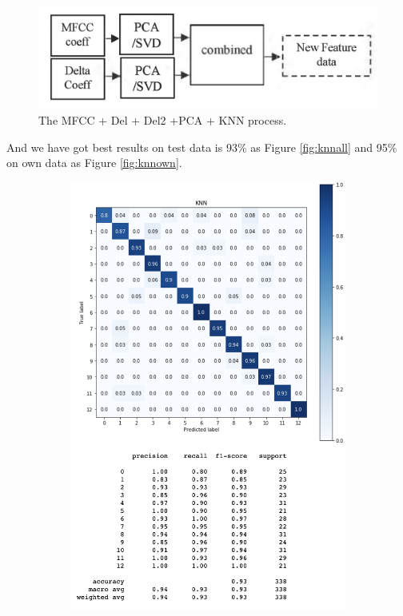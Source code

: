\documentclass[%
  article,%
  10pt,%
  a4paper,%
  fleqn,%
  oneside,%
  sumario = tradicional,%
  chapter = TITLE,%
  section = TITLE,%
]{abntex2}
\begin{document}
\begin{figure}[H]
  \centering
  \includegraphics[width = 0.7\columnwidth]{./Figuras/pcs}
  \caption{The MFCC + Del + Del2 +PCA + KNN process.}
  \label{fig:pcs}
\end{figure}
And we have got best results on test data is 93\% as Figure \ref{fig:knnall} and 95\% on own data as Figure \ref{fig:knnown}.
\begin{figure}
\centering
\begin{minipage}[b]{.4\textwidth}
\begin{figure}[H]
  \centering
  \includegraphics[width = \columnwidth]{./Figuras/knnall}

\end{figure}
\end{minipage}
\end{figure}
\end{document}
